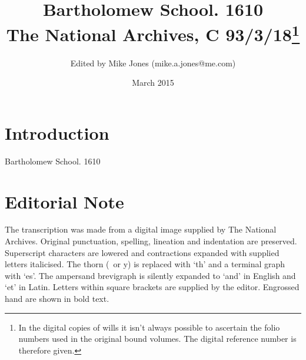 \documentclass[a4paper,12pt]{article}
\makeatletter
\def\authorname{Mike Jones}
\def\authoremail{mike.a.jones@me.com}
\def\shorttitle{Bartholomew School. 1610}
\def\abstract{Bartholomew School. 1610}
\def\pubdate{March 2015}
\def\archivename{The National Archives}
\def\archiverefno{C 93/3/18}
\makeatother
\begin{document}
\title{\Large \shorttitle\\\normalsize \vspace{1em} \archivename \hspace{0 mm}, \archiverefno\footnote{In the digital copies of wills it isn't always possible to ascertain the folio numbers used in the original bound volumes. The digital reference number is therefore given.} \hspace{1 mm}}\vspace{-5em}
\author{\small Edited by \authorname \hspace{0 mm} (\authoremail)}
\date{\small \pubdate}
\maketitle

\section*{Introduction}

\abstract

\section*{Editorial Note}

The transcription was made from a digital image supplied by The National Archives. Original punctuation, spelling, lineation and indentation are preserved. Superscript characters are lowered and contractions expanded with supplied letters italicised. The thorn (\th\ or y) is replaced with `th' and a terminal graph with `es'. The ampersand brevigraph is silently expanded to `and' in English and `et' in Latin. Letters within square brackets are supplied by the editor. Engrossed hand are shown in bold text.
\end{document}
